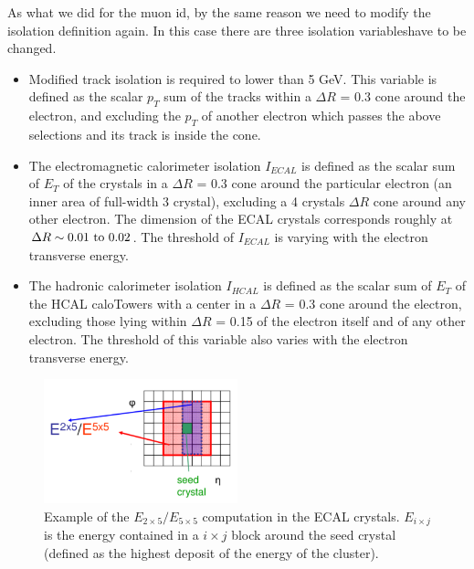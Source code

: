 As what we did for the muon id, by the same reason we need to modify the isolation definition again. In this case there are three isolation variableshave to be changed.

\begin{itemize}
\item Modified track isolation is required to lower than 5 GeV. This variable is defined as the scalar $p_{T}$ sum of the tracks within a $\Delta R$ = 0.3 cone around the electron, and excluding the $p_{T}$ of another electron which passes the above selections and its track is inside the cone.
\item The electromagnetic calorimeter isolation $I_{ECAL}$ is defined as the scalar sum of $E_{T}$ of the crystals in a $\Delta R$ = 0.3 cone around the particular electron (an inner area of full-width 3 crystal), excluding a 4 crystals $\Delta R$ cone around any other electron. The dimension of the ECAL crystals corresponds roughly at $\Delta R \sim 0.01 \textup{ to } 0.02$. The threshold of $I_{ECAL}$ is varying with the electron transverse energy.
\item The hadronic calorimeter isolation $I_{HCAL}$ is defined as the scalar sum of $E_{T}$ of the HCAL caloTowers with a center in a $\Delta R$ = 0.3 cone around the electron, excluding those lying within $\Delta R$ = 0.15 of the electron itself and of any other electron\cite{CMS_AN_2012-168}. The threshold of this variable also varies with the electron transverse energy.
\end{itemize}
\newpage
\begin{figure}[hbtp]
  \begin{center}
    \includegraphics[width=0.5\textwidth]{figure/CH3/E5X5.png}
  \end{center}
  \caption{\label{fig:E5X5}Example of the $E_{2\times5}/E_{5\times5}$ computation in the ECAL crystals. $E_{i \times j}$ is the energy contained in a $i \times j$ block around the seed crystal (defined as the highest deposit of the energy of the cluster).}
\end{figure}

